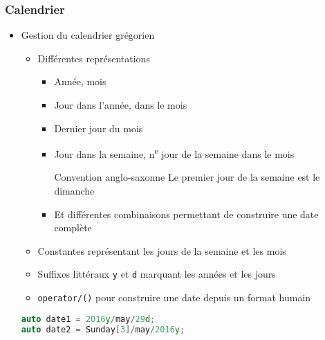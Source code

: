 \documentclass[C++.tex]{subfiles}
\begin{document}
\begin{frame}[fragile]
	\frametitle{Calendrier}
	\begin{itemize}
		\item Gestion du calendrier grégorien
		\begin{itemize}
			\item Différentes représentations
			\begin{itemize}
				\item Année, mois
				\item Jour dans l'année, dans le mois
				\item Dernier jour du mois
				\item Jour dans la semaine, n\textsuperscript{e} jour de la semaine dans le mois

				\begin{alertblock}{Convention anglo-saxonne}
					Le premier jour de la semaine est le dimanche
				\end{alertblock}

				\item Et différentes combinaisons permettant de construire une date complète
			\end{itemize}
			\item Constantes représentant les jours de la semaine et les mois
			\item Suffixes littéraux \lstinline|y| et \lstinline|d| marquant les années et les jours
			\item \lstinline|operator/()| pour construire une date depuis un format \og humain\fg{}
		\end{itemize}

		\begin{lstlisting}[language=C++]
auto date1 = 2016y/may/29d;
auto date2 = Sunday[3]/may/2016y;\end{lstlisting}
	\end{itemize}
\end{frame}
\end{document}
